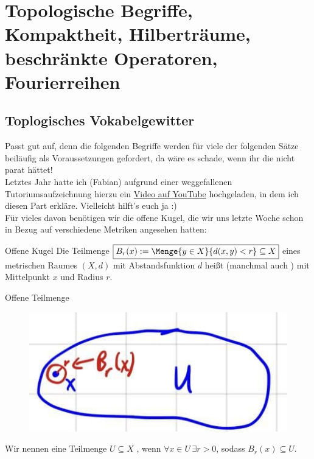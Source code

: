\section[Topologische Begriffe, Hilberträume, Fourierreihen]{Topologische Begriffe, Kompaktheit, Hilberträume, beschränkte Operatoren, Fourierreihen}

\subsection{Toplogisches Vokabelgewitter}
Passt gut auf, denn die folgenden Begriffe werden für viele der folgenden Sätze beiläufig als Voraussetzungen gefordert, da wäre es schade, wenn ihr die nicht parat hättet!\\
Letztes Jahr hatte ich (Fabian) aufgrund einer weggefallenen Tutoriumsaufzeichnung hierzu ein \href{https://youtu.be/BPn-hFZh6ww}{Video auf YouTube} hochgeladen, in dem ich diesen Part erkläre. Vielleicht hilft's euch ja :)\\
Für vieles davon benötigen wir die offene Kugel, die wir uns letzte Woche schon in Bezug auf verschiedene Metriken angesehen hatten:
\begin{Wiederholung}
{Offene Kugel}
Die Teilmenge $\boxed{B_r(x):=\Menge{y\in X}{d(x,y)<r}\subseteq X}$ eines metrischen Raumes $(X,d)$ mit Abstandsfunktion $d$ heißt  (manchmal auch ) mit Mittelpunkt $x$ und Radius $r$.
\end{Wiederholung}
\begin{Def}{Offene Teilmenge}
\begin{figure}
 \vspace{-15pt}
\includegraphics[width=.35\textwidth]{Dateien/06/06OffeneMenge.jpg}
 \vspace{-15pt}
\end{figure}
Wir nennen eine Teilmenge $U\subseteq X$ , wenn $\forall x\in U\,\exists r>0$, sodass $B_r(x)\subseteq U$.\\
\end{Def}


